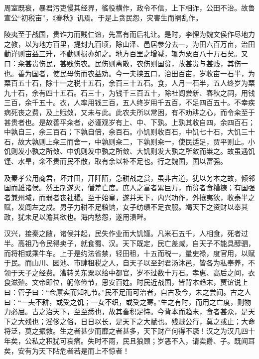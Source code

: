 \documentclass[12pt,UTF8]{ctexbook}
\begin{document}
周室既衰，暴君污吏慢其经界，徭役横作，政令不信，上下相诈，公田不治。故鲁宣公“初税亩”，《春秋》讥焉。于是上贪民怨，灾害生而祸乱作。



陵夷至于战国，贵诈力而贱仁谊，先富有而后礼让。是时，李悝为魏文侯作尽地力之教，以为地方百里，提封九百顷，除山泽、邑居参分去一，为田六百万亩，治田勤谨则亩益三升，不勤则损亦如之。地方百里之增减，辄为粟百八十万石矣。又曰：籴甚贵伤民，甚贱伤农。民伤则离散，农伤则国贫，故甚贵与甚贱，其伤一也。善为国者，使民毋伤而农益劝。今一夫挟五口，治田百亩，岁收亩一石半，为粟百五十石，除十一之税十五石，余百三十五石。食，人月一石半，五人终岁为粟九十石，余有四十五石。石三十，为钱千三百五十，除社闾尝新、春秋之祠，用钱三百，余千五十。衣，人率用钱三百，五人终岁用千五百，不足四百五十。不幸疾病死丧之费，及上赋敛，又未与此。此农夫所以常困，有不劝耕之心，而令籴至于甚贵者也。是故善平籴者，必谨观岁有上、中、下孰。上孰其收自四，余四百石；中孰自三，余三百石；下孰自倍，余百石。小饥则收百石，中饥七十石，大饥三十石，故大孰则上籴三而舍一，中孰则籴二，下孰则籴一，使民适足，贾平则止。小饥则发小孰之所敛、中饥则发中孰之所敛、大饥则发大孰之所敛而粜之。故虽遇饥馑、水旱，籴不贵而民不散，取有余以补不足也。行之魏国，国以富强。



及秦孝公用商君，坏井田，开阡陌，急耕战之赏，虽非古道，犹以务本之故，倾邻国而雄诸侯。然王制遂灭，僭差亡度。庶人之富者累巨万，而贫者食糟糠；有国强者兼州域，而弱者丧社稷。至于始皇，遂并天下，内兴功作，外攘夷狄，收泰半之赋，发闾左之戍。男子力耕不足粮饷，女子纺绩不足衣服。竭天下之资财以奉其政，犹未足以澹其欲也。海内愁怨，遂用溃畔。



汉兴，接秦之敝，诸侯并起，民失作业而大饥馑。凡米石五千，人相食，死者过半。高祖乃令民得卖子，就食蜀、汉。天下既定，民亡盖臧，自天子不能具醇驷，而将相或乘牛车。上于是约法省禁，轻田租，十五而税一，量吏禄，度官用，以赋于民。而山川、园池、市肆租税之人，自天子以至封君汤沐邑，皆各为私奉养，不领于天子之经费。漕转关东粟以给中都官，岁不过数十万石。孝惠、高后之间，衣食滋殖。文帝即位，躬修俭节，思安百姓。时民近战国，皆背本趋末，贾谊说上曰：管子曰：“仓廪实而知礼节。”民不足而可治者，自古及今，未之尝闻。古之人曰：“一夫不耕，或受之饥；一女不织，或受之寒。”生之有时，而用之亡度，则物力必屈。古之治天下，至至悉也，故其畜积足恃。今背本而趋末，食者甚众，是天下之大残也；淫侈之俗，日日以长，是天下之大赋也。残贼公行，莫之或止；大命将泛，莫之振救。生之者甚少而靡之者甚多，天下财产何得不蹶！汉之为汉几四十年矣，公私之积犹可哀痛。失时不雨，民且狼顾；岁恶不入，请卖爵、子。既闻耳矣，安有为天下阽危者若是而上不惊者！
\end{document}
